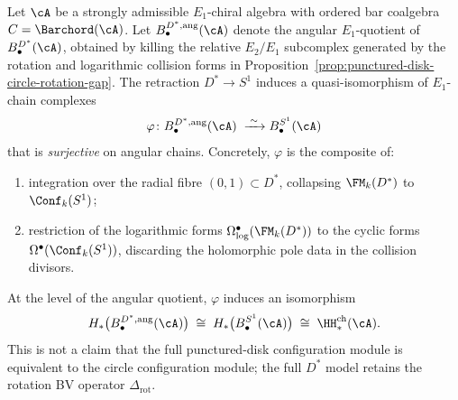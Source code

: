 \begin{proposition}%
\label{prop:punctured-disk-S1-qiso}%
%
%
%
Let $\cA$ be a strongly admissible $E_1$-chiral algebra
with ordered bar coalgebra $C=\Barchord(\cA)$.
Let \(B^{D^*,\mathrm{ang}}_\bullet(\cA)\) denote the angular
\(E_1\)-quotient of \(B^{D^*}_\bullet(\cA)\), obtained by killing the
relative \(E_2/E_1\) subcomplex generated by the rotation and
logarithmic collision forms in
Proposition~\ref{prop:punctured-disk-circle-rotation-gap}. The
retraction \(D^*\to S^1\) induces a quasi-isomorphism
of \(E_1\)-chain complexes
\begin{equation}\label{eq:punctured-disk-S1-qiso}
\varphi\colon
B^{D^*,\mathrm{ang}}_\bullet(\cA)
\;\xrightarrow{\;\sim\;}
B^{S^1}_\bullet(\cA)
\end{equation}
that is \emph{surjective} on angular chains. Concretely, $\varphi$ is
the composite of:
\begin{enumerate}[label=\textup{(\alph*)}]
\item integration over the radial fibre
 $(0,1)\subset D^*$, collapsing $\FM_k(D^*)$ to
 $\Conf_k(S^1)$;
\item restriction of the logarithmic forms
 $\Omega^\bullet_{\log}(\FM_k(D^*))$ to the
 cyclic forms $\Omega^\bullet(\Conf_k(S^1))$,
 discarding the holomorphic pole data in the
 collision divisors.
\end{enumerate}
At the level of the angular quotient, $\varphi$ induces an
isomorphism
\begin{equation}\label{eq:punctured-disk-homology}
H_*\bigl(B^{D^*,\mathrm{ang}}_\bullet(\cA)\bigr)
\;\cong\;
H_*\bigl(B^{S^1}_\bullet(\cA)\bigr)
\;\cong\;
\HH^{\mathrm{ch}}_*(\cA).
\end{equation}
This is not a claim that the full punctured-disk configuration module is
equivalent to the circle configuration module; the full \(D^*\) model
retains the rotation BV operator \(\Delta_{\mathrm{rot}}\).
\end{proposition}

